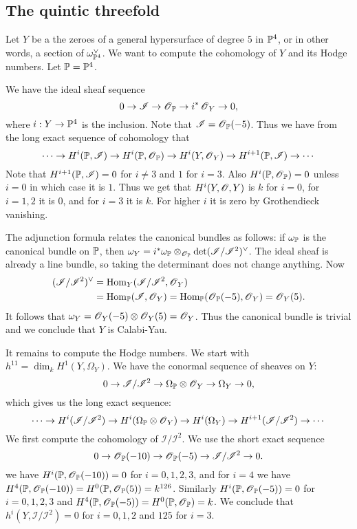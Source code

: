 \documentclass[11pt, english]{article}
\begin{document}
\subsection{The quintic threefold}

Let $Y$ be a the zeroes of a general hypersurface of degree $5$ in $\mathbb{P}^4$, or in other words, a section of $\omega_{\mathbb{P}^4}^\vee$. We want to compute the cohomology of $Y$ and its Hodge numbers. Let $\mathbb{P} = \mathbb{P}^4$.

We have the ideal sheaf sequence
$$
0 \to \mathscr I \to \operatorname{\mathscr{O}}_{\mathbb{P}} \to i^\ast \operatorname{\mathscr{O}}_Y \to 0,
$$
where $i:Y \to \mathbb{P}^4$ is the inclusion. Note that $\mathscr I = \operatorname{\mathscr{O}}_{\mathbb{P}}(-5)$. Thus we have from the long exact sequence of cohomology that
$$
\cdots \to H^i(\mathbb{P}, \mathscr I) \to H^i(\mathbb{P},\operatorname{\mathscr{O}}_{\mathbb{P}}) \to H^i(Y,\operatorname{\mathscr{O}}_Y) \to H^{i+1}(\mathbb{P},\mathscr I) \to \cdots
$$
Note that $H^{i+1}(\mathbb{P},\mathscr I) = 0$ for $i \neq 3$ and $1$ for $i=3$. Also $H^i(\mathbb{P},\operatorname{\mathscr{O}}_{\mathbb{P}})=0$ unless $i=0$ in which case it is $1$. Thus we get that $H^i(Y,\operatorname{\mathscr{O}},Y)$ is $k$ for $i=0$, for $i=1,2$ it is $0$, and for $i=3$ it is $k$. For higher $i$ it is zero by Grothendieck vanishing.

The adjunction formula relates the canonical bundles as follows: if $\omega_{\mathbb{P}}$ is the canonical bundle on $\mathbb{P}$, then $\omega_Y = i^\ast \omega_{\mathbb{P}} \otimes_{\operatorname{\mathscr{O}}_{\mathbb{P}}} \det(\mathscr I/\mathscr I^2)^\vee$. The ideal sheaf is already a line bundle, so taking the determinant does not change anything. Now
\begin{align*}
(\mathscr I/\mathscr I^2)^\vee &= \operatorname{Hom}_Y(\mathscr I/\mathscr I^2,\operatorname{\mathscr{O}}_Y) \\
&= \operatorname{Hom}_{\mathbb{P}}(\mathscr I,\operatorname{\mathscr{O}}_Y)=\operatorname{Hom}_{\mathbb{P}}(\operatorname{\mathscr{O}}_{\mathbb{P}}(-5),\operatorname{\mathscr{O}}_Y)=\operatorname{\mathscr{O}}_Y(5).
\end{align*}
It follows that $\omega_Y = \operatorname{\mathscr{O}}_Y(-5) \otimes \operatorname{\mathscr{O}}_Y(5)=\operatorname{\mathscr{O}}_Y$. Thus the canonical bundle is trivial and we conclude that $Y$ is Calabi-Yau.

It remains to compute the Hodge numbers. We start with $h^{11} = \dim_k H^1(Y,\Omega_Y)$. We have the conormal sequence of sheaves on $Y$:
$$
0 \to \mathscr I / \mathscr I^2 \to \Omega_{\mathbb{P}} \otimes \operatorname{\mathscr{O}}_Y \to \Omega_Y \to 0,
$$
which gives us the long exact sequence:
$$
\cdots \to H^i(\mathscr I/\mathscr I^2) \to H^i(\Omega_{\mathbb{P}} \otimes \operatorname{\mathscr{O}}_Y) \to H^i(\Omega_Y) \to H^{i+1}(\mathscr I/\mathscr I^2) \to \cdots 
$$
We first compute the cohomology of $\mathscr I/\mathscr I^2$. We use the short exact sequence
\begin{equation}
\label{normaleq}
0 \to \operatorname{\mathscr{O}}_{\mathbb{P}}(-10) \to \operatorname{\mathscr{O}}_{\mathbb{P}}(-5) \to \mathscr I / \mathscr I^2 \to 0.
\end{equation}
we have $H^i(\mathbb{P},\operatorname{\mathscr{O}}_{\mathbb{P}}(-10))=0$ for $i=0,1,2,3$, and for $i=4$ we have $H^4(\mathbb{P},\operatorname{\mathscr{O}}_{\mathbb{P}}(-10))=H^0(\mathbb{P},\operatorname{\mathscr{O}}_{\mathbb{P}}(5))=k^{126}$. Similarly $H^i(\mathbb{P},\operatorname{\mathscr{O}}_{\mathbb{P}}(-5))=0$ for $i=0,1,2,3$ and $H^4(\mathbb{P},\operatorname{\mathscr{O}}_{\mathbb{P}}(-5))=H^0(\mathbb{P},\operatorname{\mathscr{O}}_{\mathbb{P}})=k$. We conclude that $h^i(Y,\mathscr I/\mathscr I^2) = 0$ for $i=0,1,2$ and $125$ for $i=3$.
\end{document}
